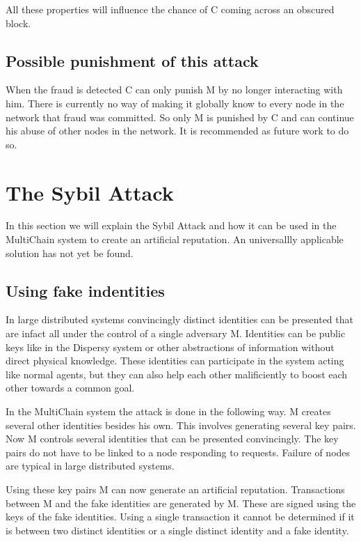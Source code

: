 All these properties will influence the chance of C coming across an obscured block.

\subsection{Possible punishment of this attack}
When the fraud is detected C can only punish M by no longer interacting with him.
There is currently no way of making it globally know to every node in the network that fraud was committed.
So only M is punished by C and can continue his abuse of other nodes in the network.
It is recommended as future work to do so.

\section{The Sybil Attack}

In this section we will explain the Sybil Attack\cite{douceur-sybil}
and how it can be used in the MultiChain system to create an artificial reputation.
An universallly applicable solution has not yet be found\cite{levine-sybilsurvey}.

\subsection{Using fake indentities}
In large distributed systems convincingly distinct identities can be presented
that are infact all under the control of a single adversary M.
Identities can be public keys like in the Dispersy system
or other abstractions of information without direct physical knowledge.
These identities can participate in the system acting like normal agents,
but they can also help each other malificiently to boost each other towards a common goal.

In the MultiChain system the attack is done in the following way.
M creates several other identities besides his own.
This involves generating several key pairs.
Now M controls several identities that can be presented convincingly.
The key pairs do not have to be linked to a node responding to requests.
Failure of nodes are typical in large distributed systems.

Using these key pairs M can now generate an artificial reputation.
Transactions between M and the fake identities are generated by M.
These are signed using the keys of the fake identities.
Using a single transaction it cannot be determined if it is between two distinct identities or a single distinct identity and a fake identity.

